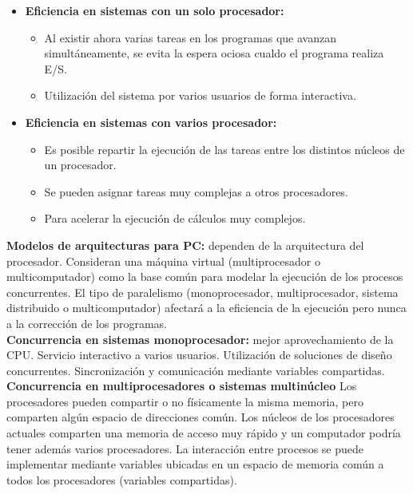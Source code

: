 \documentclass[a4paper,11pt]{article}
\begin{document}
\begin{itemize}
\item \textbf{Eficiencia en sistemas con un solo procesador:}
	\begin{itemize}
		\item Al existir ahora varias tareas en los programas que avanzan simultáneamente, se evita la espera ociosa cualdo el programa realiza E/S.
		\item Utilización del sistema por varios usuarios de forma interactiva.
	\end{itemize}
	
\item \textbf{Eficiencia en sistemas con varios procesador:}
	\begin{itemize}
		\item Es posible repartir la ejecución de las tareas entre los distintos núcleos de un procesador.
		
		\item Se pueden asignar tareas muy complejas a otros procesadores.
		
		\item Para acelerar la ejecución de cálculos muy complejos.
	\end{itemize}
\end{itemize}

\textbf{Modelos de arquitecturas para PC:} dependen de la arquitectura del procesador. Consideran una máquina virtual (multiprocesador o multicomputador) como la base común para modelar la ejecución de los procesos concurrentes. El tipo de paralelismo (monoprocesador, multiprocesador, sistema distribuido o multicomputador) afectará a la eficiencia de la ejecución pero nunca a la corrección de los programas. \\

\textbf{Concurrencia en sistemas monoprocesador:} mejor aprovechamiento de la CPU. Servicio interactivo a varios usuarios. Utilización de soluciones de diseño concurrentes. Sincronización y comunicación mediante variables compartidas. \\

\textbf{Concurrencia en multiprocesadores o sistemas multinúcleo}
Los procesadores pueden compartir o no físicamente la misma memoria, pero comparten algún espacio de direcciones común. Los núcleos de los procesadores actuales comparten una memoria de acceso muy rápido y un computador podría tener además varios procesadores. La interacción entre procesos se puede implementar mediante variables ubicadas en un espacio de memoria común a todos los procesadores (variables compartidas). \\
\end{document}
